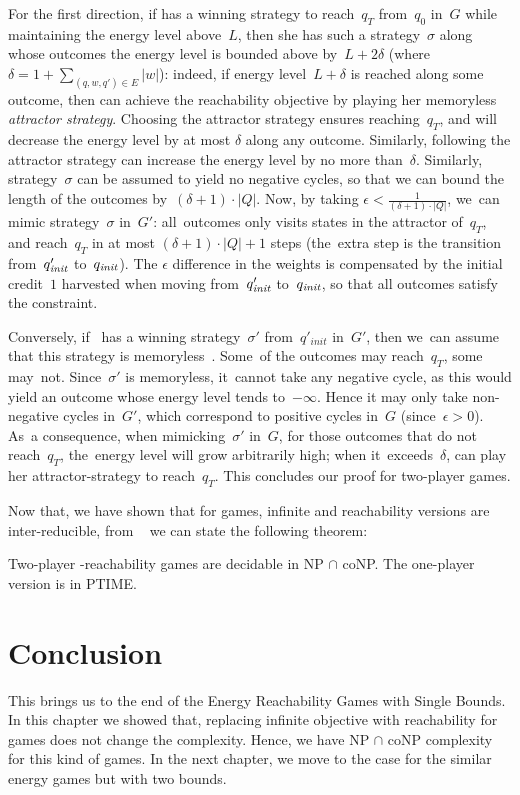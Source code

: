 For the first direction, if  has a winning strategy to reach~$q_T$ from~$q_0$ in~$G$ while maintaining the energy level above~$L$, then she has such a strategy~$\sigma$ along whose outcomes the energy level is bounded above by~$L+2\delta$ (where $\delta=1+\sum_{(q,w,q')\in E}|w|$):
indeed, if energy level~$L+\delta$ is reached along some outcome, 
then  can achieve the reachability objective
by playing her memoryless \emph{attractor strategy}.
Choosing the attractor strategy ensures reaching~$q_T$,
and will decrease the energy level by at most $\delta$ along any outcome.
Similarly, following the attractor strategy can increase the energy level by no more than~$\delta$.
Similarly,
strategy~$\sigma$ can be assumed to yield no negative cycles, so that
we can bound the length of the outcomes 
  by~$(\delta+1)\cdot |Q|$. Now,
by taking $\epsilon<\frac1{(\delta+1)\cdot |Q|}$, we~can mimic
strategy~$\sigma$ in~$G'$: all~outcomes only visits states in the
attractor of~$q_T$, and reach~$q_T$ in at most $(\delta+1)\cdot |Q|+1$
steps (the~extra step is the transition from~$q_{\textit{init}}'$ to~$q_{\textit{init}}$). The
$\epsilon$ difference in the weights is compensated by the initial
credit~$1$ harvested when moving from~$q_{\textit{init}}'$ to~$q_{\textit{init}}$, so that all
outcomes satisfy the \Lenergy constraint.

Conversely, if~ has a winning strategy~$\sigma'$ from~$q'_{init}$ in~$G'$, then we~can assume that this strategy is
memoryless~\cite{BouyerFLMS08}. Some~of the outcomes may reach~$q_T$, some may~not. Since~$\sigma'$ is memoryless, it~cannot take any negative cycle, as this would yield an outcome whose energy level tends to~$-\infty$. Hence it may only take non-negative cycles in~$G'$, which correspond to positive cycles in~$G$ (since~$\epsilon>0$). As~a consequence, when mimicking~$\sigma'$ in~$G$, for those outcomes that
do not reach~$q_T$, the~energy level will grow arbitrarily high; when it~exceeds~$\delta$,  can play her attractor-strategy to
reach~$q_T$. This concludes our proof for two-player games.
\vskip 1cm

Now that, we have shown that for \Lenergy games, infinite and reachability versions are inter-reducible, from ~\cite{BouyerFLMS08} we can state the following theorem:
\begin{theorem}
\label{thm_reachability_games}
Two-player \Lenergy-reachability games are decidable in NP $\cap$ coNP. The one-player version is in PTIME.
\end{theorem}


\section{Conclusion}
This brings us to the end of the Energy Reachability Games with Single Bounds. In this chapter we showed that, replacing infinite objective with reachability for \Lenergy games does not change the complexity. Hence, we have NP $\cap$ coNP complexity for this kind of games. In the next chapter, we move to the case for the similar energy games but with two bounds. 